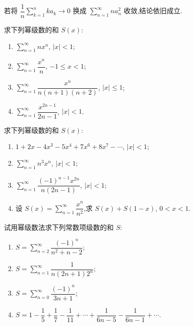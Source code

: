 \documentclass[../数学分析培优讲义.tex]{subfiles}
\begin{document}
\begin{remark}
若将 $\displaystyle\dfrac{1}{n}\sum\limits_{k=1}^{n}ka_k\to0$ 换成 $\displaystyle\sum\limits_{n=1}^{\infty}na_n^2$ 收敛,结论依旧成立.
\end{remark}

\begin{example}
求下列幂级数的和 $S(x)$:
\begin{enumerate}[label=(\arabic*)]
    \item $\displaystyle\sum\limits_{n=1}^{\infty}nx^n$, $|x|<1$;
    \item $\displaystyle\sum\limits_{n=1}^{\infty}\dfrac{x^n}{n}$, $-1\leq x<1$;
    \item $\displaystyle\sum\limits_{n=1}^{\infty}\dfrac{x^n}{n(n+1)(n+2)}$, $|x|\leq1$;
    \item $\displaystyle\sum\limits_{n=1}^{\infty}\dfrac{x^{2n-1}}{2n-1}$, $|x|<1$.
\end{enumerate}
\end{example}
\exampleblank

\begin{example}
求下列幂级数的和 $S(x)$:
\begin{enumerate}[label=(\arabic*)]
    \item $1+2x-4x^3-5x^4+7x^6+8x^7-\cdots$, $|x|<1$;
    \item $\displaystyle\sum\limits_{n=1}^{\infty}n^3x^n$, $|x|<1$;
    \item $\displaystyle\sum\limits_{n=1}^{\infty}\dfrac{(-1)^{n-1}x^{2n}}{n(2n-1)}$, $|x|<1$;
    \item 设 $\displaystyle S(x)=\sum\limits_{n=1}^{\infty}\dfrac{x^n}{n^2}$,求 $S(x)+S(1-x)$, $0<x<1$.
\end{enumerate}
\end{example}
\exampleblank

\begin{example}
试用幂级数法求下列常数项级数的和 $S$:
\begin{enumerate}[label=(\arabic*)]
    \item $\displaystyle S=\sum\limits_{n=2}^{\infty}\dfrac{(-1)^n}{n^2+n-2}$;
    \item $\displaystyle S=\sum\limits_{n=1}^{\infty}\dfrac{1}{n(2n+1)2^n}$;
    \item $\displaystyle S=\sum\limits_{n=0}^{\infty}\dfrac{(-1)^n}{3n+1}$;
    \item $\displaystyle S=1-\dfrac{1}{5}+\dfrac{1}{7}-\dfrac{1}{11}+\cdots+\dfrac{1}{6n-5}-\dfrac{1}{6n-1}+\cdots$.
\end{enumerate}
\end{example}
\exampleblank
\end{document}
